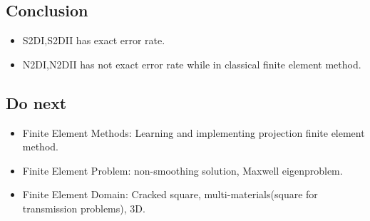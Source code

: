 \documentclass[a4paper,11pt]{article}
\begin{document}
\subsection{Conclusion}
\begin{itemize}
  \item S2DI,S2DII has exact error rate.
  \item N2DI,N2DII has not exact error rate while in classical finite element method.
\end{itemize}

\subsection{Do next}
\begin{itemize}
  \item Finite Element Methods: Learning and implementing projection finite element method.
  \item Finite Element Problem: non-smoothing solution, Maxwell eigenproblem.
  \item Finite Element Domain: Cracked square, multi-materials(square for transmission problems), 3D.
\end{itemize}
\end{document}

